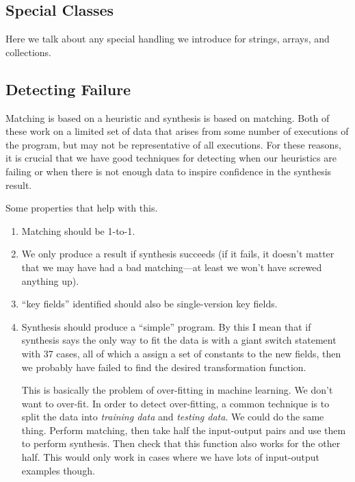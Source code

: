 
\subsection{Special Classes}

Here we talk about any special handling we introduce for strings, arrays, and collections.

\subsection{Detecting Failure}

Matching is based on a heuristic and synthesis is based on matching.
Both of these work on a limited set of data that arises from some
number of executions of the program, but may not be representative of
all executions.  For these reasons, it is crucial that we have good
techniques for detecting when our heuristics are failing or when there
is not enough data to inspire confidence in the synthesis result.

Some properties that help with this.
\begin{enumerate}
\item Matching should be 1-to-1.
\item We only produce a result if synthesis succeeds (if it fails, it
  doesn't matter that we may have had a bad matching---at least we
  won't have screwed anything up).
\item ``key fields'' identified should also be single-version key fields.
\item Synthesis should produce a ``simple'' program.  By this I mean
  that if synthesis says the only way to fit the data is with a giant
  switch statement with 37 cases, all of which a assign a set of
  constants to the new fields, then we probably have failed to find
  the desired transformation function.

  This is basically the problem of over-fitting in machine learning.
  We don't want to over-fit.  In order to detect over-fitting, a
  common technique is to split the data into \emph{training data} and
  \emph{testing data}.  We could do the same thing.  Perform matching,
  then take half the input-output pairs and use them to perform
  synthesis.  Then check that this function also works for the other
  half.  This would only work in cases where we have lots of
  input-output examples though.
\end{enumerate}

